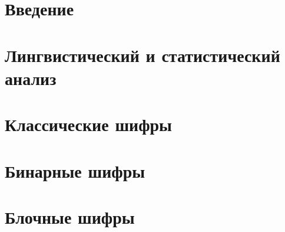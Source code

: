 \documentclass[unicode,12pt,a4paper,oneside,fleqn]{article}
\begin{document}
    
    \tableofcontents
    \pagebreak

    
    \section{Введение}
    
    \pagebreak
    
    \section{Лингвистический и статистический анализ}
    
    
    
    \pagebreak

    \section{Классические шифры}
    
    
    
    
    \pagebreak

    \section{Бинарные шифры}
    
    
    \pagebreak

    \section{Блочные шифры}
    \pagebreak

    
    
\end{document}

